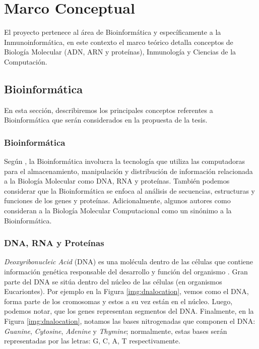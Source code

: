 \chapter{Marco Conceptual}
\label{cap:marcoteorico}


El proyecto pertenece al área de Bioinformática y específicamente a la Inmunoinformática, en este contexto el marco teórico detalla conceptos de Biología Molecular (ADN, ARN y proteínas), Inmunología y Ciencias de la Computación. 

\section{Bioinformática}

En esta sección, describiremos los principales conceptos referentes a Bioinformática que serán considerados en la propuesta de la tesis.

\subsection{Bioinformática}

Según \cite{luscombe2001bioinformatics}, la Bioinformática involucra la tecnología que utiliza las computadoras para el almacenamiento, manipulación y distribución de información relacionada a la Biología Molecular como DNA, RNA y proteínas. También podemos considerar que la Bioinformática se enfoca al análisis de secuencias, estructuras y funciones de los genes y proteínas. Adicionalmente, algunos autores como \cite{xiong2006essential} consideran a la Biología Molecular Computacional como un sinónimo a la Bioinformática.


\subsection{DNA, RNA y Proteínas}

\textit{Deoxyribonucleic Acid} (DNA) es una molécula dentro de las células que contiene información genética responsable del desarrollo y función del organismo \citep{NCIdictionary2022}. Gran parte del DNA se sitúa dentro del núcleo de las células (en organismos Eucariontes). Por ejemplo en la Figura \ref{img:dnalocation}, vemos como el DNA, forma parte de los cromosomas y estos a su vez están en el núcleo. Luego, podemos notar, que los genes representan segmentos del DNA. Finalmente, en la Figura \ref{img:dnalocation}, notamos las bases nitrogenadas que componen el DNA: \textit{Guanine}, \textit{Cytosine}, \textit{Adenine} y \textit{Thymine}; normalmente, estas bases serán representadas por las letras: G, C, A, T respectivamente.

